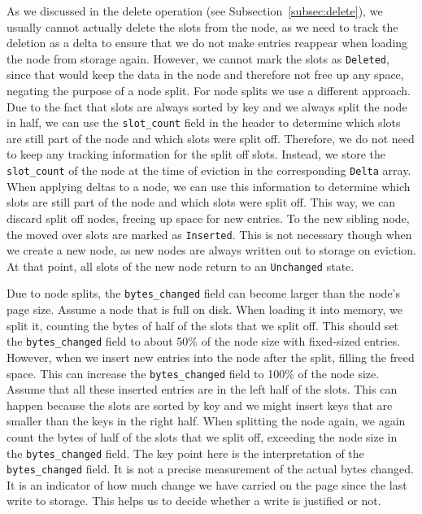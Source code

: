 As we discussed in the delete operation (see Subsection~\ref{subsec:delete}), we usually cannot actually delete the slots from the node, as we need to track the deletion as a delta to ensure that we do not make entries reappear when loading the node from storage again.
However, we cannot mark the slots as \texttt{Deleted}, since that would keep the data in the node and therefore not free up any space, negating the purpose of a node split.
For node splits we use a different approach.
Due to the fact that slots are always sorted by key and we always split the node in half, we can use the \texttt{slot\_count} field in the header to determine which slots are still part of the node and which slots were split off.
Therefore, we do not need to keep any tracking information for the split off slots.
Instead, we store the \texttt{slot\_count} of the node at the time of eviction in the corresponding \texttt{Delta} array.
When applying deltas to a node, we can use this information to determine which slots are still part of the node and which slots were split off.
This way, we can discard split off nodes, freeing up space for new entries.
To the new sibling node, the moved over slots are marked as \texttt{Inserted}.
This is not necessary though when we create a new node, as new nodes are always written out to storage on eviction.
At that point, all slots of the new node return to an \texttt{Unchanged} state.

Due to node splits, the \texttt{bytes\_changed} field can become larger than the node's page size.
Assume a node that is full on disk. 
When loading it into memory, we split it, counting the bytes of half of the slots that we split off.
This should set the \texttt{bytes\_changed} field to about 50\% of the node size with fixed-sized entries.
However, when we insert new entries into the node after the split, filling the freed space.
This can increase the \texttt{bytes\_changed} field to 100\% of the node size.
Assume that all these inserted entries are in the left half of the slots.
This can happen because the slots are sorted by key and we might insert keys that are smaller than the keys in the right half.
When splitting the node again, we again count the bytes of half of the slots that we split off, exceeding the node size in the \texttt{bytes\_changed} field.
The key point here is the interpretation of the \texttt{bytes\_changed} field.
It is not a precise measurement of the actual bytes changed.
It is an indicator of how much change we have carried on the page since the last write to storage.
This helps us to decide whether a write is justified or not.

